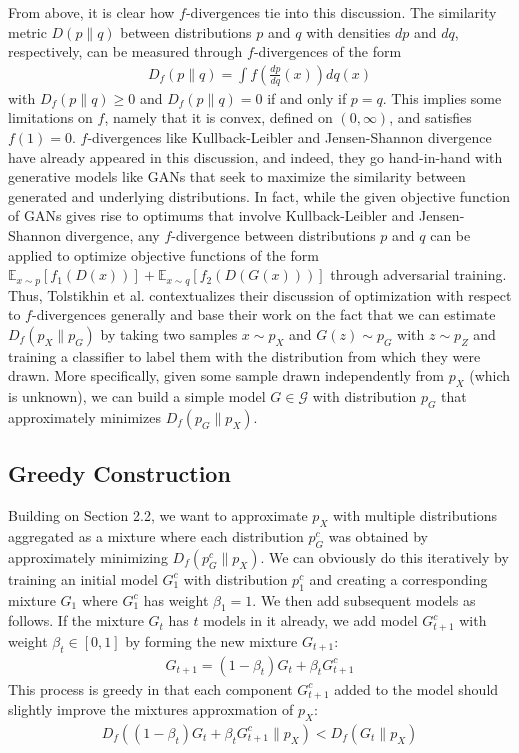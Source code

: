 \documentclass[submission]{eptcs}
\newcommand{\calG}{\mathcal G}
\begin{document}
From above, it is clear how $f$-divergences tie into this discussion. The similarity metric $D(p \| q)$ between distributions $p$ and $q$ with densities $dp$ and $dq$, respectively, can be measured through $f$-divergences of the form
\begin{align}
    D_f(p \| q) = \int f \left( \frac{dp}{dq}(x) \right) dq(x)
\end{align}
with $D_f(p \| q) \geq 0$ and $D_f(p \| q) = 0$ if and only if $p = q$. This implies some limitations on $f$, namely that it is convex, defined on $(0, \infty)$, and satisfies $f(1) = 0$. $f$-divergences like Kullback-Leibler and Jensen-Shannon divergence have already appeared in this discussion, and indeed, they go hand-in-hand with generative models like GANs that seek to maximize the similarity between generated and underlying distributions. In fact, while the given objective function of GANs gives rise to optimums that involve Kullback-Leibler and Jensen-Shannon divergence, any $f$-divergence between distributions $p$ and $q$ can be applied to optimize objective functions of the form $\mathbb E_{x \sim p}[f_1(D(x))] + \mathbb E_{x \sim q}[f_2(D(G(x)))]$ through adversarial training. Thus, Tolstikhin et al. contextualizes their discussion of optimization with respect to $f$-divergences generally and base their work on the fact that we can estimate $D_f(p_X \| p_G)$ by taking two samples $x \sim p_X$ and $G(z) \sim p_G$ with $z \sim p_Z$ and training a classifier to label them with the distribution from which they were drawn. More specifically, given some sample drawn independently from $p_X$ (which is unknown), we can build a simple model $G \in \calG$ with distribution $p_G$ that approximately minimizes $D_f(p_G \| p_X)$. 

\subsection{Greedy Construction}

Building on Section 2.2, we want to approximate $p_X$ with multiple distributions aggregated as a mixture where each distribution $p_G^c$ was obtained by approximately minimizing $D_f(p_G^c \| p_X)$. We can obviously do this iteratively by training an initial model $G_1^c$ with distribution $p_1^c$ and creating a corresponding mixture $G_1$ where $G_1^c$ has weight $\beta_1 = 1$. We then add subsequent models as follows. If the mixture $G_t$ has $t$ models in it already, we add model $G_{t+1}^c$ with weight $\beta_t \in [0, 1]$ by forming the new mixture $G_{t+1}$:
\begin{align}
    G_{t+1} = (1 - \beta_t)G_t + \beta_t G_{t+1}^c
\end{align}
This process is greedy in that each component $G_{t+1}^c$ added to the model should slightly improve the mixtures approxmation of $p_X$:
\begin{align}
    D_f((1 - \beta_t)G_t + \beta_t G_{t+1}^c \| p_X) < D_f(G_t \| p_X)
\end{align}
\end{document}
